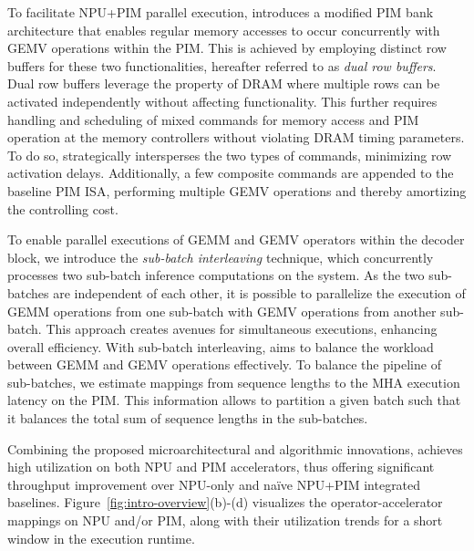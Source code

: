 %
To facilitate NPU+PIM parallel execution, \neupims introduces a modified PIM bank architecture that enables regular memory accesses to occur concurrently with GEMV operations within the PIM. 
%
This is achieved by employing distinct row buffers for these two functionalities, hereafter referred to as \textit{dual row buffers}.
%
Dual row buffers leverage the property of DRAM where multiple rows can be activated independently without affecting functionality.
%
This further requires handling and scheduling of mixed commands for memory access and PIM operation at the memory controllers without violating DRAM timing parameters.
%
To do so, \neupims strategically intersperses the two types of commands, minimizing row activation delays. Additionally, a few composite commands are appended to the baseline PIM ISA, performing multiple GEMV operations and thereby amortizing the controlling cost.

%
%
To enable parallel executions of GEMM and GEMV operators within the decoder block, we introduce the \emph{sub-batch interleaving} technique, which concurrently processes two sub-batch inference computations on the \neupims system.
%
As the two sub-batches are independent of each other, it is possible to parallelize the execution of GEMM operations from one sub-batch with GEMV operations from another sub-batch.
%
This approach creates avenues for simultaneous executions, enhancing overall efficiency.
%
With sub-batch interleaving, \neupims aims to balance the workload between GEMM and GEMV operations effectively.
%
To balance the pipeline of sub-batches, we estimate mappings from sequence lengths to the MHA execution latency on the PIM. 
%
This information allows \neupims to partition a given batch such that it balances the total sum of sequence lengths in the sub-batches.


Combining the proposed microarchitectural and algorithmic innovations, \neupims achieves high utilization on both NPU and PIM accelerators, thus offering significant throughput improvement over NPU-only and na\"ive NPU+PIM integrated baselines. 
%
Figure~\ref{fig:intro-overview}(b)-(d) visualizes the operator-accelerator mappings on NPU and/or PIM, along with their utilization trends for a short window in the execution runtime.


